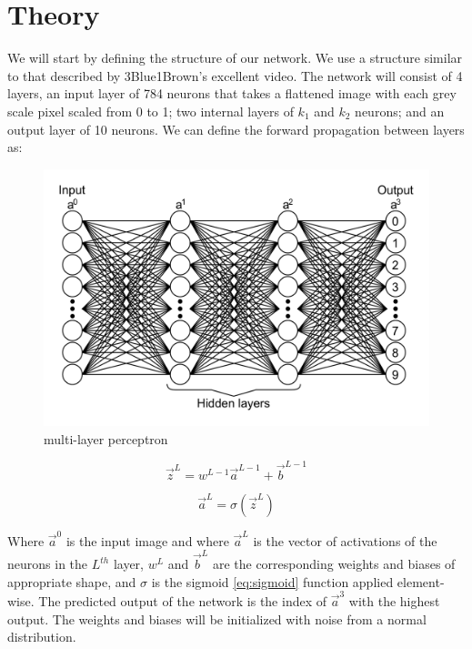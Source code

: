 \documentclass[sigconf,authorversion,nonacm]{acmart}
\begin{document}
\section{Theory}

We will start by defining the structure of our network. We use a structure similar to that described by 3Blue1Brown's excellent video\cite{3b1b}. The network will consist of 4 layers, an input layer of 784 neurons that takes a flattened image with each grey scale pixel scaled from 0 to 1; two internal layers of $k_1$ and $k_2$ neurons; and an output layer of 10 neurons. We can define the forward propagation between layers as:

\begin{figure}
    \centering
    \includegraphics[width=0.9\linewidth]{images/nn.png}
    \caption{multi-layer perceptron}
    \label{fig:nn}
\end{figure}

\begin{equation}
    \vec{z}^L = w^{L-1}\vec{a}^{L-1}+\vec{b}^{L-1}
    \label{eq:forward-propagation-z}
\end{equation}

\begin{equation}
    \vec{a}^L = \sigma(\vec{z}^L)
    \label{eq:forward-propagation}
\end{equation}

Where $\vec{a}^0$ is the input image and where $\vec{a}^L$ is the vector of activations of the neurons in the $L^{th}$ layer, $w^L$ and $\vec{b}^L$ are the corresponding weights and biases of appropriate shape, and $\sigma$ is the sigmoid \eqref{eq:sigmoid} function applied element-wise. The predicted output of the network is the index of $\vec{a}^3$ with the highest output. The weights and biases will be initialized with noise from a normal distribution.
\end{document}
